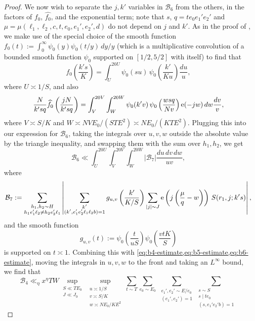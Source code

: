 \documentclass[reqno,11pt]{amsart}
\theoremstyle{definition}
\theoremstyle{remark}
\numberwithin{equation}{section}
\newcommand{\mB}{\mathcal{B}}
\newcommand{\e}{\textnormal{e}}
\renewcommand{\hat}{\widehat}
\begin{document}
\begin{proof}
We now wish to separate the $j, k'$ variables in $\mB_6$ from the others, in the factors of $f_0$, $\hat{f_0}$, and the exponential term; note that $s$, $q = te_0e_1'e_2'$ and $\mu = \mu(\ell_1, \ell_2, c, t, e_0, e_1', e_2', d)$ do not depend on $j$ and $k'$. As in the proof of \cite[Lemma 18.5]{maynard2020primes}, we make use of the special choice of the smooth function $f_0(t) := \int_0^\infty \psi_0(y) \psi_0(t/y)\, dy/y$ (which is a multiplicative convolution of a bounded smooth function $\psi_0$ supported on $[1/2, 5/2]$ with itself) to find that
\[
    f_0\left(\frac{k's}{K}\right)
    =
    \int_U^{20U} \psi_0(su)\, \psi_0\left(\frac{k'}{Ku}\right) \frac{du}{u},
\]
where $U \asymp 1/S$, and also
\[
    \frac{N}{k'sq}\hat{f_0} \left( \frac{jN}{k'sq} \right) 
    =
    \int_V^{20V} \int_W^{20W} \psi_0(k'v)\, \psi_0\left(\frac{wsq}{Nv} \right) \e(-jw)\, dw \frac{dv}{v},
\]
where $V \asymp S/K$ and $W \asymp NVE_0/(STE^2) \asymp NE_0/(KTE^2)$. Plugging this into our expression for $\mB_6$, taking the integrals over $u, v, w$ outside the absolute value by the triangle inequality, and swapping them with the sum over $h_1, h_2$, we get 
\begin{equation} \label{eq:b6-estimate}
    \mB_6 \ll \int_U^{20 U} \int_V^{20 V} \int_W^{20 W} |\mB_7| \frac{du\, dv\, dw}{uv},
\end{equation}
where
\[
    \mB_7 := \sum_{\substack{h_1, h_2 \sim H \\ h_1e_1'\ell_2 \neq h_2e_2'\ell_1}}
    \left\vert 
    \sum_{\substack{k' \\ (k', e_1'e_2'\ell_1\ell_2b) = 1}} g_{u,v} \left(\frac{k'}{K/S}\right)
    \sum_{|j| \sim J} \e\left(j \left(\frac{\mu}{q} - w\right)\right)\, S(r_1, j; k's)
    \right\vert,
\]
and the smooth function
\[
    g_{u,v}(t) := \psi_0\left(\frac{t}{uS}\right) \psi_0\left(\frac{vtK}{S}\right)
\]
is supported on $t \asymp 1$. Combining this with \cref{eq:b4-estimate,eq:b5-estimate,eq:b6-estimate}, moving the integrals in $u, v, w$ to the front and taking an $L^\infty$ bound, we find that
\[
    \mB_4 \ll_\eta x^{\eta} TW
    \sup_{\substack{S \ll TE_0 \\ J \ll J_0}} 
    \sup_{\substack{u \asymp 1/S \\ v \asymp S/K \\ w \asymp NE_0/KE^2}}
    \sum_{t \sim T} \sum_{e_0 \sim E_0}\,
    \sum_{\substack{e_1', e_2' \sim E/e_0 \\ (e_1', e_2') = 1}}
    \sum_{\substack{s \sim S \\ s \mid te_0 \\ (s, e_1'e_2'b) = 1}}
\]
\end{proof}
\end{document}
